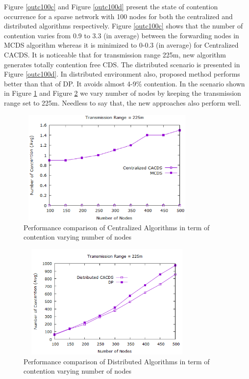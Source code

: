 Figure \ref{outc100c} and Figure \ref{outc100d} present the state of contention occurrence for a sparse network with 100 nodes for both the centralized and distributed algorithms respectively. Figure \ref{outc100c} shows that the number of contention varies from 0.9 to 3.3 (in average) between the forwarding nodes in MCDS algorithm whereas it is minimized to 0-0.3 (in average) for Centralized CACDS. It is noticeable that for transmission range 225m, new algorithm generates totally contention free CDS. The distributed scenario is presented in Figure \ref{outc100d}. In distributed environment also, proposed method performs better than that of DP. It  avoids almost 4-9\% contention. In the scenario shown in Figure \ref{outc225c} and Figure \ref{outc225d} we vary number of nodes by keeping the transmission range set to 225m. Needless to say that, the new approaches also perform well.
\begin{figure}[h]
    \centering
    \includegraphics[width=90mm, height=57mm]{Figures/outc225c.eps}
    \caption{Performance comparison of Centralized Algorithms in term of contention varying number of nodes}
    \label{outc225c}
    \end{figure}
    \begin{figure}[h]
    \centering
    \includegraphics[width=90mm, height=57mm]{Figures/outc225d.png}
    \caption{Performance comparison of Distributed Algorithms in term of contention varying number of nodes}
    \label{outc225d}
\end{figure}

